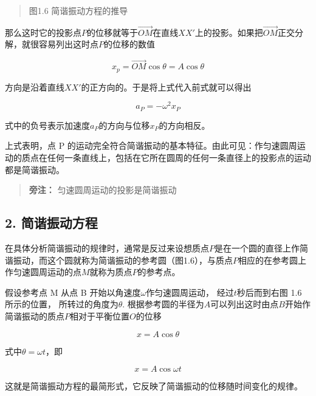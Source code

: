 \begin{quote}
图1.6 简谐振动方程的推导
\end{quote}

那么这时它的投影点\(P\)的位移就等于\(\overrightarrow{OM}\)在直线\(XX'\)上的投影。如果把\(\overrightarrow{OM}\)正交分解，就很容易列出这时点\(P\)的位移的数值

\[
x _ {p} = \overrightarrow {O M} \cos \theta = A \cos \theta
\]

方向是沿着直线\(XX'\)的正方向的。于是将上式代入前式就可以得出

\[
a _ {P} = - \omega^ {2} x _ {P} \tag {1.4}
\]

式中的负号表示加速度\(a_{P}\)的方向与位移\(x_{P}\)的方向相反。

上式表明，点 P
的运动完全符合简谐振动的基本特征。由此可见：作匀速圆周运动的质点在任何一条直线上，包括在它所在圆周的任何一条直径上的投影点的运动都是简谐振动。

\begin{quote}
\textbf{旁注：} 匀速圆周运动的投影是简谐振动
\end{quote}

\subsection{2.
简谐振动方程}\label{ux7b80ux8c10ux632fux52a8ux65b9ux7a0b-1}

在具体分析简谐振动的规律时，通常是反过来设想质点\(P\)是在一个圆的直径上作简谐振动，而这个圆就称为简谐振动的参考圆（图1.6），与质点\(P\)相应的在参考圆上作匀速圆周运动的点\(M\)就称为质点\(P\)的参考点。

假设参考点 M 从点 B 开始以角速度\(\omega\)作匀速圆周运动，
经过\(t\)秒后而到右图 1.6 所示的位置， 所转过的角度为\(\theta\).
根据参考圆的半径为\(A\)可以列出这时由点\(B\)开始作简谐振动的质点\(P\)相对于平衡位置\(O\)的位移

\[
x = A \cos \theta
\]

式中\(\theta = \omega t\)，即

\[
x = A \cos \omega t \tag {1.5}
\]

这就是简谐振动方程的最简形式，它反映了简谐振动的位移随时间变化的规律。

